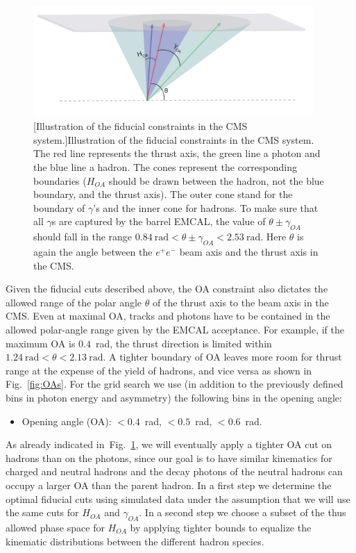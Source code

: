 \begin{figure}[H]
  \centering
  \includegraphics[width=0.95\textwidth,natwidth=610,natheight=642]{figure_dataselection/OA.pdf}
  [Illustration of the fiducial constraints in the CMS system.]{Illustration of the fiducial constraints in the CMS system. The red line represents the thrust axis, the green line a photon and the blue line a hadron. The cones represent the corresponding boundaries ($H_{OA}$ should be drawn between the hadron, not the blue boundary, and the thrust axis). The outer cone stand for the boundary of $\gamma$'s and the inner cone for hadrons. To make sure that all $\gamma$s are captured by the barrel EMCAL, the value of $\theta \pm \gamma_{OA}$ should fall in the range $0.84~\text{rad}<\theta\pm \gamma_{OA}<2.53~\text{rad}$. Here $\theta$ is again the angle between the $e^+e^-$ beam axis and the thrust axis in the CMS.}
  \label{fig:FiducialCut}
\end{figure}
 
 Given the fiducial cuts described above, the OA constraint also dictates the allowed range of the polar angle $\theta$ of the thrust axis to the beam axis in the CMS.  Even at maximal OA, tracks and photons have to be contained in the allowed polar-angle range given by the EMCAL acceptance. For example, if the maximum OA is $0.4$~rad, the thrust direction is limited within $1.24~\text{rad}<\theta<2.13~\text{rad}$.  A tighter boundary of OA leaves more room for thrust range at the expense of the yield of hadrons, and vice versa as shown in Fig.~\ref{fig:OAs}. For the grid search we use (in addition to the previously defined bins in photon energy and asymmetry) the following bins in the opening angle:
\begin{itemize}
\item Opening angle (OA): $<0.4$~rad, $<0.5$~rad, $<0.6$~rad.
\end{itemize}

As already indicated in~Fig.~\ref{fig:FiducialCut}, we will eventually apply a tighter OA cut on hadrons than on the photons, since our goal is to have similar kinematics for charged and neutral hadrons and the decay photons of the neutral hadrons can occupy a larger OA than the parent hadron. In a first step we determine the optimal fiducial cuts using simulated data under the assumption that we will use the same cuts for $H_{OA}$ and $\gamma_{OA}$.  In a second step we choose a subset of the thus allowed phase space for $H_{OA}$ by applying tighter bounds to equalize the kinematic distributions between the different hadron species.

